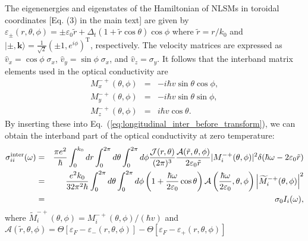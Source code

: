 \documentclass[aps,twocolumn,floatfix]{revtex4-1}
\begin{document}
The eigenenergies and eigenstates of the Hamiltonian of NLSMs in toroidal coordinates [Eq. (3) in the main text] are given by $\varepsilon_\pm(r,\theta,\phi)=\pm \varepsilon_0 \tilde{r} + \Delta_{t} (1 + \tilde{r} \cos{\theta}) \cos{\phi}$ where $\tilde{r}=r/k_0$ and $|\pm,\bm{k}\rangle=\frac{1}{\sqrt{2}}(\pm1,e^{i\phi})^\mathrm{T}$, respectively. The velocity matrices are expressed as $\hat{v}_x=\cos{\phi}\;\sigma_x$, $\hat{v}_y=\sin{\phi}\;\sigma_x$, and $\hat{v}_z=\sigma_y$.  It follows that the interband matrix elements used in the optical conductivity are
\begin{eqnarray}
M_{x}^{-+}(\theta,\phi)&=&-i\hbar v \sin{\theta} \cos{\phi},\\
M_{y}^{-+}(\theta,\phi)&=&-i\hbar v \sin {\theta} \sin {\phi},\\
M_{z}^{-+}(\theta,\phi)&=&i\hbar v \cos {\theta}.
\end{eqnarray}
By inserting these into Eq.~(\ref{eq:longitudinal_inter_before_transform}), we can obtain the interband part of the optical conductivity at zero temperature:
\begin{eqnarray}
\label{eq:longitudinal_inter_intermediate}
\sigma^{\rm inter}_{ii}(\omega)
&=&\frac{\pi e^2}{\hbar}
\int_0^{k_0} dr \int_0^{2\pi} d\theta \int_0^{2\pi} d\phi
\frac{\mathcal{J}(r,\theta)}{(2\pi)^3}
\frac{\mathcal{A}(\tilde{r},\theta,\phi)}
{2\varepsilon_0 \tilde{r}}
|M^{-+}_i(\theta,\phi)|^2
\delta(\hbar\omega-2\varepsilon_0 \tilde{r})\nonumber\\
&=&\frac{ e^2 k_0}{32\pi^2\hbar}
\int_0^{2\pi} d\theta \int_0^{2\pi} d\phi
\left(1+\frac{\hbar\omega}{2\varepsilon_0}\cos{\theta}\right)
\mathcal{A}\left(\frac{\hbar\omega}{2\varepsilon_0},\theta,\phi\right)
\left|\widetilde{M}_i^{-+}(\theta,\phi)\right|^2\nonumber\\
&=&\sigma_0 I_i(\omega),
\end{eqnarray}
where $\widetilde{M}_i^{-+}(\theta,\phi)=M_i^{-+}(\theta,\phi)/(\hbar v)$ and
$\mathcal{A}(\tilde{r},\theta,\phi)=\Theta \left[\varepsilon_{F}-\varepsilon_{-}(r,\theta,\phi)\right]-\Theta\left[\varepsilon_{F}-\varepsilon_{+}(r,\theta,\phi)\right]$
\end{document}

